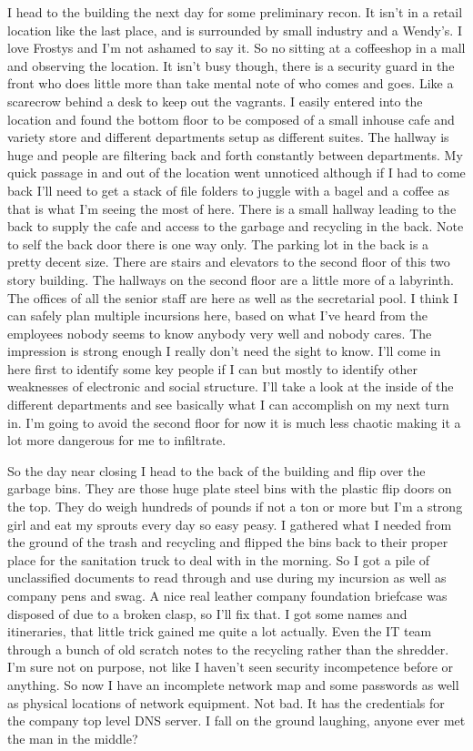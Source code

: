 I head to the building the next day for some preliminary recon. It isn't in a retail location like the last place, and is surrounded by small industry and a Wendy's. I love Frostys and I'm not ashamed to say it. So no sitting at a coffeeshop in a mall and observing the location. It isn't busy though, there is a security guard in the front who does little more than take mental note of who comes and goes. Like a scarecrow behind a desk to keep out the vagrants. I easily entered into the location and found the bottom floor to be composed of a small inhouse cafe and variety store and different departments setup as different suites. The hallway is huge and people are filtering back and forth constantly between departments. My quick passage in and out of the location went unnoticed although if I had to come back I'll need to get a stack of file folders to juggle with a bagel and a coffee as that is what I'm seeing the most of here. There is a small hallway leading to the back to supply the cafe and access to the garbage and recycling in the back. Note to self the back door there is one way only. The parking lot in the back is a pretty decent size. There are stairs and elevators to the second floor of this two story building. The hallways on the second floor are a little more of a labyrinth. The offices of all the senior staff are here as well as the secretarial pool. I think I can safely plan multiple incursions here, based on what I've heard from the employees nobody seems to know anybody very well and nobody cares. The impression is strong enough I really don't need the sight to know. I'll come in here first to identify some key people if I can but mostly to identify other weaknesses of electronic and social structure. I'll take a look at the inside of the different departments and see basically what I can accomplish on my next turn in. I'm going to avoid the second floor for now it is much less chaotic making it a lot more dangerous for me to infiltrate.

So the day near closing I head to the back of the building and flip over the garbage bins. They are those huge plate steel bins with the plastic flip doors on the top. They do weigh hundreds of pounds if not a ton or more but I'm a strong girl and eat my sprouts every day so easy peasy. I gathered what I needed from the ground of the trash and recycling and flipped the bins back to their proper place for the sanitation truck to deal with in the morning. So I got a pile of unclassified documents to read through and use during my incursion as well as company pens and swag. A nice real leather company foundation briefcase was disposed of due to a broken clasp, so I'll fix that. I got some names and itineraries, that little trick gained me quite a lot actually. Even the IT team through a bunch of old scratch notes to the recycling rather than the shredder. I'm sure not on purpose, not like I haven't seen security incompetence before or anything. So now I have an incomplete network map and some passwords as well as physical locations of network equipment. Not bad. It has the credentials for the company top level DNS server. I fall on the ground laughing, anyone ever met the man in the middle?

